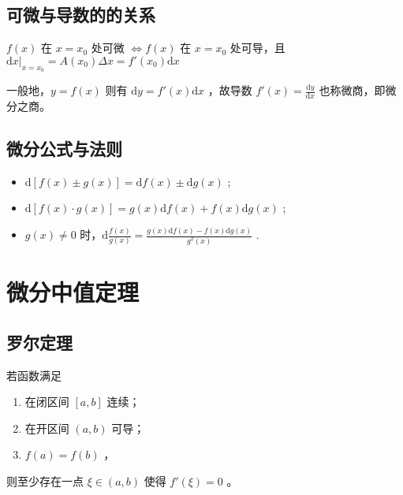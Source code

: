 \subsection{可微与导数的的关系}

\begin{Theo}[可微与导数的关系]

    $ f(x) $ 在 $ x=x_0 $ 处可微 $ \Leftrightarrow f(x) $ 在 $ x=x_0 $ 处可导，且
    $ \mathrm{d}x|_{x=x_0} =A(x_0)\Delta x=f'(x_0)\mathrm{d}x $ 
\end{Theo}

一般地，$ y=f(x) $ 则有 $ \mathrm{d}y=f'(x)\mathrm{d}x $ ，故导数 $ f'(x)=\frac{\mathrm{d}y}{\mathrm{d}x} $ 也称微商，即微分之商。

\subsection{微分公式与法则}

\begin{Field}[]

    \begin{itemize}
        \item $ \mathrm{d}[f(x)\pm g(x)]=\mathrm{d}f(x)\pm\mathrm{d}g(x) $ ;
        \item $ \mathrm{d}[f(x)\cdot g(x)]=g(x)\mathrm{d}f(x)+f(x)\mathrm{d}g(x) $ ;
        \item $ g(x)\neq0 $ 时，$ \mathrm{d}\frac{f(x)}{g(x)}=\frac{g(x)\mathrm{d}f(x)-f(x)\mathrm{d}g(x)}{g^2(x)} $ .
    \end{itemize}
\end{Field}  

\section{微分中值定理}

\subsection{罗尔定理}

\begin{Theo}[罗尔定理]

    若函数满足
    \begin{enumerate}
        \item 在闭区间 $ [a,b] $ 连续；
        \item 在开区间 $ (a,b) $ 可导；
        \item $ f(a)=f(b) $ ，
    \end{enumerate}
    则至少存在一点 $ \xi\in(a,b) $ 使得 $ f'(\xi)=0 $ 。
\end{Theo}

